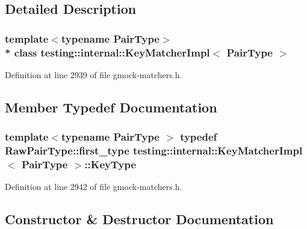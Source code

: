 \subsection{Detailed Description}
\subsubsection*{template$<$typename Pair\+Type$>$\\*
class testing\+::internal\+::\+Key\+Matcher\+Impl$<$ Pair\+Type $>$}



Definition at line 2939 of file gmock-\/matchers.\+h.



\subsection{Member Typedef Documentation}
\subsubsection[{\texorpdfstring{Key\+Type}{KeyType}}]{\setlength{\rightskip}{0pt plus 5cm}template$<$typename Pair\+Type $>$ typedef Raw\+Pair\+Type\+::first\+\_\+type {\bf testing\+::internal\+::\+Key\+Matcher\+Impl}$<$ Pair\+Type $>$\+::{\bf Key\+Type}}\hypertarget{classtesting_1_1internal_1_1_key_matcher_impl_a9bd63b699518bd9868ba24766547667a}{}\label{classtesting_1_1internal_1_1_key_matcher_impl_a9bd63b699518bd9868ba24766547667a}


Definition at line 2942 of file gmock-\/matchers.\+h.



\subsection{Constructor \& Destructor Documentation}
